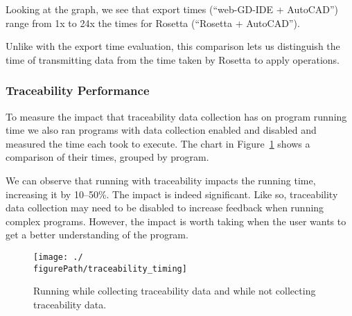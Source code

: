 Looking at the graph, we see that export times (``web-GD-IDE + AutoCAD'') range from 1x to 24x the times for Rosetta (``Rosetta + AutoCAD'').


Unlike with the export time evaluation, this comparison lets us distinguish the time of transmitting data from the time taken by Rosetta to apply operations.



\subsubsection{Traceability Performance}

To measure the impact that traceability data collection has on program running time we also ran programs with data collection enabled and disabled and measured the time each took to execute.
The chart in Figure~\ref{fig:traceability:timing} shows a comparison of their times, grouped by program.

We can observe that running with traceability impacts the running time, increasing it by 10--50\%.
The impact is indeed significant.
Like so, traceability data collection may need to be disabled to increase feedback when running complex programs.
However, the impact is worth taking when the user wants to get a better understanding of the program.

\begin{figure}
  \centering
  \texttt{[image: ./\\figurePath/traceability\_timing]}
  \caption{Running while collecting traceability data and while not collecting traceability data.}
  \label{fig:traceability:timing}
\end{figure}
